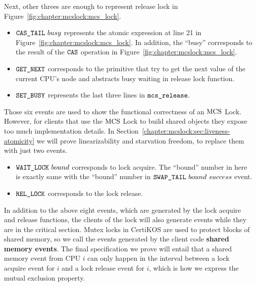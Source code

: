 Next, other threes are enough to represent release lock in Figure~\ref{fig:chapter:mcslock:mcs_lock}.

\begin{itemize}

\item \textbf{${\mathrm{\texttt{CAS\_TAIL}}}~{busy}$} represents the atomic expression at line 21  in Figure~\ref{fig:chapter:mcslock:mcs_lock}. 
In addition, the ``busy'' corresponds to the result of the ${\mathrm{\texttt{CAS}}}$ operation in Figure~\ref{fig:chapter:mcslock:mcs_lock}.

\item  \textbf{${\mathrm{\texttt{GET\_NEXT}}}$} corresponds to the primitive that try to get the next value of the current CPU's node and abstracts busy waiting in release lock function.

\item  \textbf{${\mathrm{\texttt{SET\_BUSY}}}$} represents the last three lines in ${\mathrm{\texttt{mcs\_release}}}$.
\end{itemize}

Those six events are used to show the functional correctness of
an $\mathrm{MCS}$ Lock. However, for clients that use the $\mathrm{MCS}$ Lock to build shared
objects they expose too much implementation details.
In Section~\ref{chapter:mcslock:sec:liveness-atomicity} we will prove linearizability and
starvation freedom,  to replace them
with just two events.


\begin{itemize} 
\item \textbf{${\mathrm{\texttt{WAIT\_LOCK}}}~{bound}$} corresponds to lock acquire. The ``bound'' number in here is exactly same with the ``bound'' number in ${\mathrm{\texttt{SWAP\_TAIL}}}~{bound}~{success}$ event.

\item \textbf{${\mathrm{\texttt{REL\_LOCK}}}$} corresponds to the lock release.
\end{itemize}

In addition to the above eight events, which are generated by the lock
acquire and release functions, the clients of the lock will also
generate events while they are in the critical section. Mutex locks in
CertiKOS are used to protect blocks of shared memory, so we call the
events generated by the client code \textbf{shared memory events}. The
final specification we prove will entail that a shared memory event
from CPU $i$ can only happen in the interval between a lock acquire
event for $i$ and a lock release event for $i$, which is how we
express the mutual exclusion property.